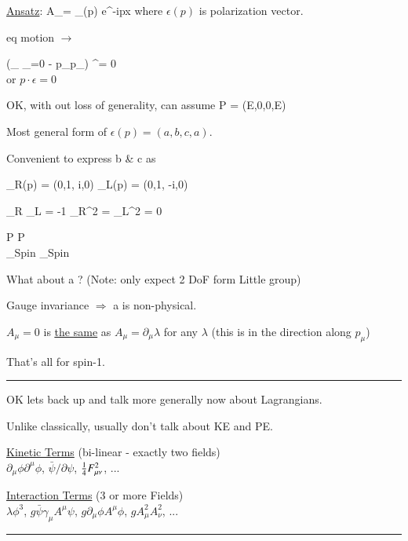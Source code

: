 {\underline{Ansatz}:
\be
A_\mu = \epsilon_\mu(p) e^{-ip\cdot x}
\ee
where $\epsilon(p)$ is  polarization vector.

eq motion $\rightarrow$ 

\bea
(\eta_{\mu\nu} _{=0} - p_\mu  p_\nu ) \epsilon^\nu = 0\\
\eea
or $p\cdot \epsilon = 0$

OK, with out loss of generality, can assume
\be
P = (E,0,0,E)
\ee 

Most general form of $\epsilon(p) = (a, b, c, a)$. 


Convenient to express b \& c as

\be
\epsilon_R(p) = (0,1, i,0)  \hspace{1in} \epsilon_L(p) = (0,1, -i,0)
\ee


\be
\epsilon_R \cdot \epsilon_L = -1 \hspace{1in}  {\epsilon_R}^2 = {\epsilon_L}^2 = 0
\ee

\bea
\longrightarrow P \hspace{1in} \longrightarrow P\\
\underbrace{\rightarrow}_{Spin} \hspace{1in}  \underbrace{\leftarrow}_{Spin}
\eea


What about a ? 
(Note: only expect 2 DoF form Little group) 

Gauge invariance $\Rightarrow$ a is non-physical. 


$A_\mu = 0 $ is \underline{\underline{the same}} as $A_\mu = \partial_\mu \lambda$ for any $\lambda$
(this is in the direction along $p_\mu$)

That's all for spin-1. 

\noindent\rule{\textwidth}{1pt}

OK lets back up and talk more generally now about Lagrangians. 

Unlike classically, usually don't talk about KE and PE. 

\underline{Kinetic Terms} (bi-linear - exactly two fields) \\
$\partial_\mu \phi \partial^\mu \phi$,  $\bar{\psi} \slash{\partial} \psi$, $\frac{1}{4} F_{\mu\nu}^2$,  ... 

\underline{Interaction Terms} (3 or more Fields)\\
$\lambda \phi^3$, $g\bar{\psi}\gamma_\mu A^\mu\psi$, $g\partial_\mu\phi A^\mu\phi$,  $gA_\mu^2A_\nu^2$, ...

\noindent\rule{\textwidth}{1pt}

}
